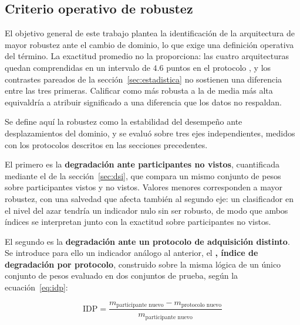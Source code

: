 \subsection{Criterio operativo de robustez}
\label{sec:criterio-robustez}

El objetivo general de este trabajo plantea la identificación de la arquitectura de mayor
robustez ante el cambio de dominio, lo que exige una definición operativa del término. La
exactitud promedio no la proporciona: las cuatro arquitecturas quedan comprendidas en un
intervalo de $4.6$ puntos en el protocolo \loso{}, y los contrastes pareados de la
sección~\ref{sec:estadistica} no sostienen una diferencia entre las tres primeras.
Calificar como más robusta a la de media más alta equivaldría a atribuir significado a una
diferencia que los datos no respaldan.

Se define aquí la robustez como la estabilidad del desempeño ante desplazamientos del
dominio, y se evaluó sobre tres ejes independientes, medidos con los protocolos descritos
en las secciones precedentes.

El primero es la \textbf{degradación ante participantes no vistos}, cuantificada mediante
el \dsi{} de la sección~\ref{sec:dsi}, que compara un mismo conjunto de pesos sobre
participantes vistos y no vistos. Valores menores corresponden a mayor robustez, con una
salvedad que afecta también al segundo eje: un clasificador en el nivel del azar tendría un
indicador nulo sin ser robusto, de modo que ambos índices se interpretan junto con la
exactitud sobre participantes no vistos.

El segundo es la \textbf{degradación ante un protocolo de adquisición distinto}. Se
introduce para ello un indicador análogo al anterior, el \textbf{\idp{}, índice de
degradación por protocolo}, construido sobre la misma lógica de un único conjunto de pesos
evaluado en dos conjuntos de prueba, según la ecuación~\eqref{eq:idp}:

\begin{equation}
\mathrm{IDP} =
  \frac{m_{\text{participante nuevo}} - m_{\text{protocolo nuevo}}}
       {m_{\text{participante nuevo}}}
\label{eq:idp}
\end{equation}

